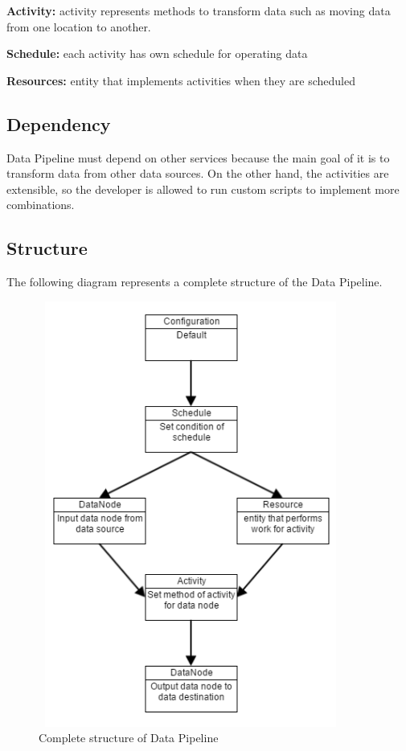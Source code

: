      \noindent\textbf{Activity:} activity represents methods to transform data such as moving data from one location to another. 
     
     \noindent\textbf{Schedule:} each activity has own schedule for operating data
     
     \noindent\textbf{Resources:} entity that implements activities when they are scheduled 
     
	\subsection{Dependency}
	Data Pipeline must depend on other services because the main goal of it is to transform data from other data sources. On the other hand, the activities are extensible, so the developer is allowed to run custom scripts to implement more combinations.
     
    \subsection{Structure}
	The following diagram represents a complete structure of the Data Pipeline. 

    \begin{figure}[H]
        \includegraphics[width=10cm, height=14cm]{data_pipeline.png}
        \centering
        \caption{Complete structure of Data Pipeline}
    \end{figure}
    
